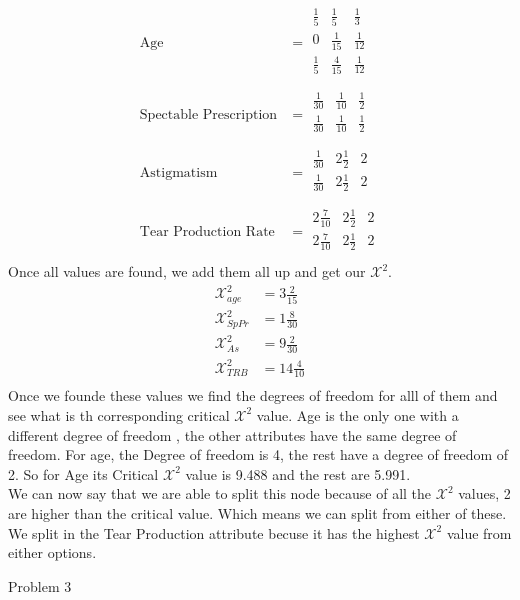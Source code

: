 \documentclass[12pt,english]{article}
\begin{document}
\begin{equation}\tag{3}\label{eq:3}
\begin{split}
\mbox{Age} &=
\begin{array}{|ccc|}
\frac{1}{5} & \frac{1}{5}  & \frac{1}{3} \\
\hline
0           & \frac{1}{15} & \frac{1}{12} \\
\hline
\frac{1}{5} & \frac{4}{15} & \frac{1}{12} \\
\end{array}
\\
\mbox{Spectable Prescription} &=
\begin{array}{|ccc|}
\frac{1}{30} & \frac{1}{10} & \frac{1}{2} \\
\hline
\frac{1}{30} & \frac{1}{10} & \frac{1}{2} \\
\end{array}
\\
\mbox{Astigmatism} &=
\begin{array}{|ccc|}
\frac{1}{30} & 2\frac{1}{2} & 2 \\
\hline
\frac{1}{30} & 2\frac{1}{2} & 2 \\
\end{array}
\\
\mbox{Tear Production Rate} &=
\begin{array}{|ccc|}
2\frac{7}{10} & 2\frac{1}{2} & 2 \\
\hline
2\frac{7}{10} & 2\frac{1}{2} & 2 \\
\end{array}
\end{split}
\end{equation}
Once all values are found, we add them all up and get our $\mathcal{X}^2$.
\begin{equation}\tag{4}\label{eq:4}
\begin{split}
\mathcal{X}^{2}_{age} &= 3\frac{2}{15}\\
\mathcal{X}^{2}_{SpPr} &= 1\frac{8}{30}\\
\mathcal{X}^{2}_{As} &= 9\frac{2}{30}\\
\mathcal{X}^{2}_{TRB} &= 14\frac{4}{10}\\
\end{split}
\end{equation}
Once we founde these values we find the degrees of freedom for alll of them and see what is th corresponding critical $\mathcal{X}^2$ value. Age is the only one with a different degree of freedom , the other attributes have the same degree of freedom. For age, the Degree of freedom is 4, the rest have  a degree of freedom of 2. So for Age its Critical $\mathcal{X}^2$ value is 9.488 and the rest are 5.991.\\
We can now say that we are able to split this node because of all the $\mathcal{X}^2$ values, 2 are higher than the critical value. Which means we can split from either of these. We split in the Tear Production attribute becuse it has the highest $\mathcal{X}^2$ value from either options.
\par
Problem 3
\end{document}
